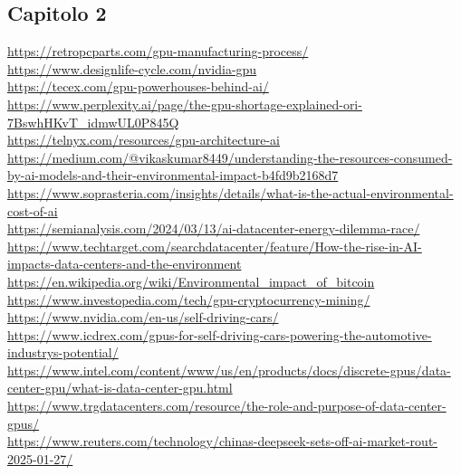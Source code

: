 \documentclass[12pt,a4paper,oneside]{book}
\begin{document}
\subsection*{Capitolo 2}
\url{https://retropcparts.com/gpu-manufacturing-process/} \\
\url{https://www.designlife-cycle.com/nvidia-gpu} \\
\url{https://tecex.com/gpu-powerhouses-behind-ai/} \\
\url{https://www.perplexity.ai/page/the-gpu-shortage-explained-ori-7BswhHKvT_idmwUL0P845Q} \\
\url{https://telnyx.com/resources/gpu-architecture-ai} \\
\url{https://medium.com/@vikaskumar8449/understanding-the-resources-consumed-by-ai-models-and-their-environmental-impact-b4fd9b2168d7} \\
\url{https://www.soprasteria.com/insights/details/what-is-the-actual-environmental-cost-of-ai} \\
\url{https://semianalysis.com/2024/03/13/ai-datacenter-energy-dilemma-race/} \\
\url{https://www.techtarget.com/searchdatacenter/feature/How-the-rise-in-AI-impacts-data-centers-and-the-environment} \\
\url{https://en.wikipedia.org/wiki/Environmental_impact_of_bitcoin} \\
\url{https://www.investopedia.com/tech/gpu-cryptocurrency-mining/} \\
\url{https://www.nvidia.com/en-us/self-driving-cars/} \\
\url{https://www.icdrex.com/gpus-for-self-driving-cars-powering-the-automotive-industrys-potential/} \\
\url{https://www.intel.com/content/www/us/en/products/docs/discrete-gpus/data-center-gpu/what-is-data-center-gpu.html} \\
\url{https://www.trgdatacenters.com/resource/the-role-and-purpose-of-data-center-gpus/}\\
\url{https://www.reuters.com/technology/chinas-deepseek-sets-off-ai-market-rout-2025-01-27/}
\end{document}
